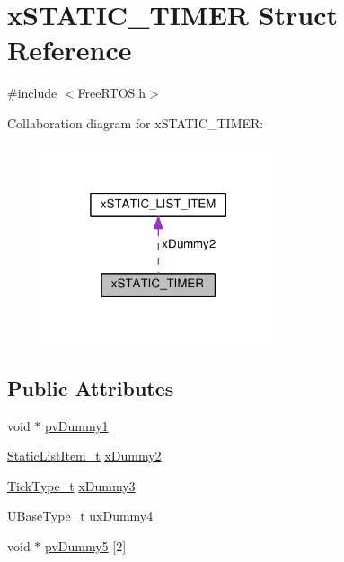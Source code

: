 \hypertarget{structx_s_t_a_t_i_c___t_i_m_e_r}{}\section{x\+S\+T\+A\+T\+I\+C\+\_\+\+T\+I\+M\+ER Struct Reference}
\label{structx_s_t_a_t_i_c___t_i_m_e_r}


{\ttfamily \#include $<$Free\+R\+T\+O\+S.\+h$>$}



Collaboration diagram for x\+S\+T\+A\+T\+I\+C\+\_\+\+T\+I\+M\+ER\+:\nopagebreak
\begin{figure}[H]
\begin{center}
\leavevmode
\includegraphics[width=193pt]{structx_s_t_a_t_i_c___t_i_m_e_r__coll__graph}
\end{center}
\end{figure}
\subsection*{Public Attributes}
\begin{DoxyCompactItemize}
\item 
void $\ast$ \hyperlink{structx_s_t_a_t_i_c___t_i_m_e_r_a040499298faced6032f84f3a33c785fd}{pv\+Dummy1}
\item 
\hyperlink{_free_r_t_o_s_8h_a1d31bc0472385a87424518da484d9e09}{Static\+List\+Item\+\_\+t} \hyperlink{structx_s_t_a_t_i_c___t_i_m_e_r_a622e2e596e5829c9197bb44b9009474f}{x\+Dummy2}
\item 
\hyperlink{portmacro_8h_aa69c48c6e902ce54f70886e6573c92a9}{Tick\+Type\+\_\+t} \hyperlink{structx_s_t_a_t_i_c___t_i_m_e_r_a60d582d1d0b5b9b15e8050d5ae29bc30}{x\+Dummy3}
\item 
\hyperlink{portmacro_8h_a646f89d4298e4f5afd522202b11cb2e6}{U\+Base\+Type\+\_\+t} \hyperlink{structx_s_t_a_t_i_c___t_i_m_e_r_abe61bde25ac09934004caa0222f4831b}{ux\+Dummy4}
\item 
void $\ast$ \hyperlink{structx_s_t_a_t_i_c___t_i_m_e_r_a9410b4450349079b65e2c25605913cbf}{pv\+Dummy5} \mbox{[}2\mbox{]}
\end{DoxyCompactItemize}


